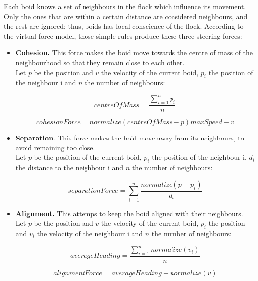Each boid knows a set of neighbours in the flock which influence its movement. Only the ones that are within a certain distance are considered neighbours, and the rest are ignored; thus, boids has local conscience of the flock. According to the virtual force model, those simple rules produce these three steering forces:

\begin{itemize}

\item{{\bf Cohesion.} This force makes the boid move towards the centre of mass of the neighbourhood so that they remain close to each other.\\

Let $p$ be the position and $v$ the velocity of the current boid, $p_i$ the position of the neighbour i and $n$ the number of neighbours:

\begin{equation}
  centreOfMass=\frac{\sum_{i=1}^np_i}{n}
\end{equation}

\begin{equation}
  cohesionForce=normalize(centreOfMass-p)maxSpeed-v
\end{equation}
}

\item{{\bf Separation.} This force makes the boid move away from its neighbours, to avoid remaining too close.\\

Let $p$ be the position of the current boid, $p_i$ the position of the neighbour i, $d_i$ the distance to the neighbour i and $n$ the number of neighbours:

\begin{equation}
  separationForce=\sum_{i=1}^n\frac{normalize(p-p_i)}{d_i}
\end{equation}
}

\item{{\bf Alignment.} This attemps to keep the boid aligned with their neighbours.\\

Let $p$ be the position and $v$ the velocity of the current boid, $p_i$ the position and $v_i$ the velocity of the neighbour i and $n$ the number of neighbours:

\begin{equation}
  averageHeading=\frac{\sum_{i=1}^nnormalize(v_i)}{n}
\end{equation}

\begin{equation}
  alignmentForce=averageHeading-normalize(v)
\end{equation}
}

\end{itemize}

